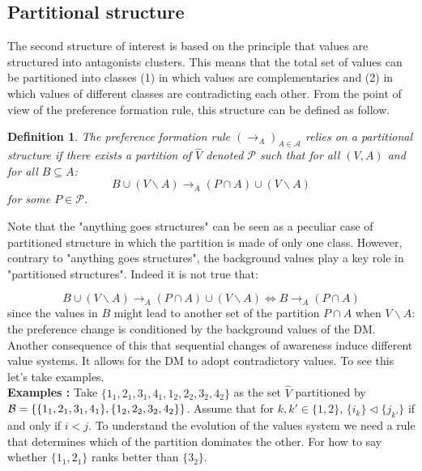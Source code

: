 \documentclass[11pt]{article}
\newtheorem{definition}{Definition}
\begin{document}
\subsection{Partitional structure}

The second structure of interest is based on the principle that values are structured into antagonists clusters. This means that the total set of values can be partitioned into classes (1) in which values are complementaries and (2) in which values of different classes are contradicting each other. From the point of view of the preference formation rule, this structure can be defined as follow.  


\begin{definition} The preference formation rule  $(\rightarrow_A)_{A\in\mathcal{A}}$ relies on a partitional structure if there exists a partition of $\hat{V}$ denoted $\mathcal{P}$ such that for all $(V,A)$ and for all $B\subseteq A$:
\begin{equation}
B\cup (V\backslash A) \rightarrow_A (P\cap A) \cup (V\backslash A)
\end{equation}
for some $P\in\mathcal{P}$.
\label{partition1}
\end{definition}

Note that the "anything goes structures" can be seen as a peculiar case of partitioned structure in which the partition is made of only one class. However, contrary to "anything goes structures", the background values play a key role in "partitioned structures". Indeed it is not true that: 

\begin{equation*}
B\cup (V\backslash A) \rightarrow_A (P\cap A) \cup (V\backslash A) \iff 
B \rightarrow_A (P\cap A) 
\end{equation*}
since the values in $B$ might lead to another set of the partition $P\cap A$ when $V\backslash A$: the preference change is conditioned by the background values of the DM. Another consequence of this that sequential changes of awareness induce different value systems. It allows for the DM to adopt contradictory values. To see this let's take examples. 
\\

\noindent
\textbf{Examples :} Take $\{1_1,2_1,3_1,4_1,1_2,2_2, 3_2,4_2\}$ as the set $\hat{V}$ partitioned by $\mathcal{B}= \{\{1_1,2_1,3_1,4_1\},\\ \{1_2,2_2,3_2,4_2\}\}$. Assume that for $k,k'\in \{1,2\}$, $\{i_k\}\triangleleft \{j_{k'}\}$ if and only if $i<j$. To understand the evolution of the values system we need a rule that determines which of the partition dominates the other. For how to say whether $\{1_1,2_1\}$ ranks better than $\{3_2\}$.
\end{document}
